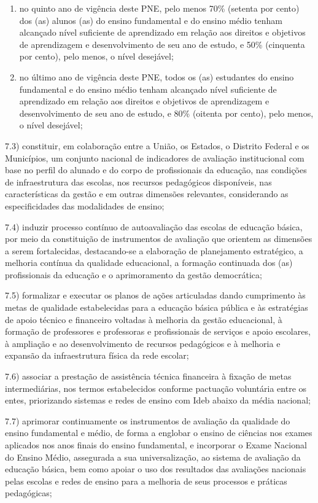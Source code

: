 \documentclass[
]{book}
\begin{document}
\begin{enumerate}
\def\labelenumi{\alph{enumi})}
\item
  no quinto ano de vigência deste PNE, pelo menos 70\% (setenta por cento) dos (as) alunos (as) do ensino fundamental e do ensino médio tenham alcançado nível suficiente de aprendizado em relação aos direitos e objetivos de aprendizagem e desenvolvimento de seu ano de estudo, e 50\% (cinquenta por cento), pelo menos, o nível desejável;
\item
  no último ano de vigência deste PNE, todos os (as) estudantes do ensino fundamental e do ensino médio tenham alcançado nível suficiente de aprendizado em relação aos direitos e objetivos de aprendizagem e desenvolvimento de seu ano de estudo, e 80\% (oitenta por cento), pelo menos, o nível desejável;
\end{enumerate}

7.3) constituir, em colaboração entre a União, os Estados, o Distrito Federal e os Municípios, um conjunto nacional de indicadores de avaliação institucional com base no perfil do alunado e do corpo de profissionais da educação, nas condições de infraestrutura das escolas, nos recursos pedagógicos disponíveis, nas características da gestão e em outras dimensões relevantes, considerando as especificidades das modalidades de ensino;

7.4) induzir processo contínuo de autoavaliação das escolas de educação básica, por meio da constituição de instrumentos de avaliação que orientem as dimensões a serem fortalecidas, destacando-se a elaboração de planejamento estratégico, a melhoria contínua da qualidade educacional, a formação continuada dos (as) profissionais da educação e o aprimoramento da gestão democrática;

7.5) formalizar e executar os planos de ações articuladas dando cumprimento às metas de qualidade estabelecidas para a educação básica pública e às estratégias de apoio técnico e financeiro voltadas à melhoria da gestão educacional, à formação de professores e professoras e profissionais de serviços e apoio escolares, à ampliação e ao desenvolvimento de recursos pedagógicos e à melhoria e expansão da infraestrutura física da rede escolar;

7.6) associar a prestação de assistência técnica financeira à fixação de metas intermediárias, nos termos estabelecidos conforme pactuação voluntária entre os entes, priorizando sistemas e redes de ensino com Ideb abaixo da média nacional;

7.7) aprimorar continuamente os instrumentos de avaliação da qualidade do ensino fundamental e médio, de forma a englobar o ensino de ciências nos exames aplicados nos anos finais do ensino fundamental, e incorporar o Exame Nacional do Ensino Médio, assegurada a sua universalização, ao sistema de avaliação da educação básica, bem como apoiar o uso dos resultados das avaliações nacionais pelas escolas e redes de ensino para a melhoria de seus processos e práticas pedagógicas;
\end{document}
